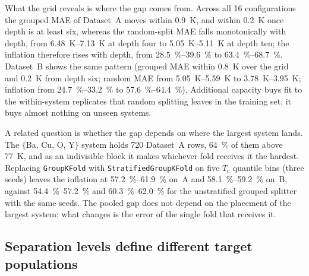 \documentclass{iopjournal}
\newcommand{\Tc}{T_{\mathrm c}}
\begin{document}
What the grid reveals is where the gap comes from. Across all \num{16} configurations the grouped
MAE of Dataset~A moves within \SI{0.9}{\kelvin}, and within \SI{0.2}{\kelvin} once depth is at least
six, whereas the random-split MAE falls monotonically with depth, from
\SIrange[range-phrase=--,range-units=single]{6.48}{7.13}{\kelvin} at depth four to
\SIrange[range-phrase=--,range-units=single]{5.05}{5.11}{\kelvin} at depth ten; the inflation
therefore rises with depth, from \SIrange[range-phrase=--,range-units=single]{28.5}{39.6}{\percent}
to \SIrange[range-phrase=--,range-units=single]{63.4}{68.7}{\percent}. Dataset~B shows the same
pattern (grouped MAE within \SI{0.8}{\kelvin} over the grid and \SI{0.2}{\kelvin} from depth six; random MAE from \SIrange[range-phrase=--,range-units=single]{5.05}{5.59}{\kelvin} to \SIrange[range-phrase=--,range-units=single]{3.78}{3.95}{\kelvin}; inflation from \SIrange[range-phrase=--,range-units=single]{24.7}{33.2}{\percent} to \SIrange[range-phrase=--,range-units=single]{57.6}{64.4}{\percent}). Additional capacity buys fit to the within-system replicates that random
splitting leaves in the training set; it buys almost nothing on unseen systems.

A related question is whether the gap depends on where the largest system lands. The
$\{$Ba, Cu, O, Y$\}$ system holds \num{720} Dataset~A rows, \SI{64}{\percent} of them above
\SI{77}{\kelvin}, and as an indivisible block it makes whichever fold receives it the hardest.
Replacing \texttt{GroupKFold} with \texttt{StratifiedGroupKFold} on five $\Tc$ quantile bins
(three seeds) leaves the inflation at
\SIrange[range-phrase=--,range-units=single]{57.2}{61.9}{\percent} on~A and
\SIrange[range-phrase=--,range-units=single]{58.1}{59.2}{\percent} on~B, against
\SIrange[range-phrase=--,range-units=single]{54.4}{57.2}{\percent} and
\SIrange[range-phrase=--,range-units=single]{60.3}{62.0}{\percent} for the unstratified
grouped splitter with the same seeds. The pooled gap does not depend on the placement of the
largest system; what changes is the error of the single fold that receives it.

\subsection{Separation levels define different target populations}
\label{sec:results-levels}
\end{document}

